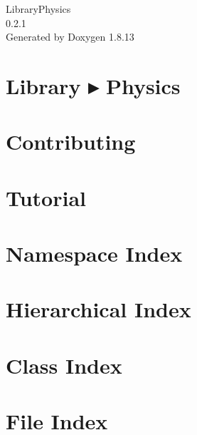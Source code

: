 \documentclass[twoside]{book}
\newcommand{\+}{\discretionary{\mbox{\scriptsize$\hookleftarrow$}}{}{}}
\newcommand{\clearemptydoublepage}{%
  \newpage{\pagestyle{empty}\cleardoublepage}%
}
\begin{document}
\hypersetup{pageanchor=false,
             bookmarksnumbered=true,
             pdfencoding=unicode
            }
\begin{titlepage}
\vspace*{7cm}
\begin{center}%
{\Large Library\+Physics \\[1ex]\large 0.\+2.\+1 }\\
\vspace*{1cm}
{\large Generated by Doxygen 1.8.13}\\
\end{center}
\end{titlepage}
\clearemptydoublepage
{}
\tableofcontents
\clearemptydoublepage
{}
\hypersetup{pageanchor=true}

\chapter{Library ▸ Physics}
\label{index}\hypertarget{index}{}
\chapter{Contributing}
\label{md__c_o_n_t_r_i_b_u_t_i_n_g}

\chapter{Tutorial}
\label{md_docs__tutorial}

\chapter{Namespace Index}

\chapter{Hierarchical Index}

\chapter{Class Index}

\chapter{File Index}

\end{document}
